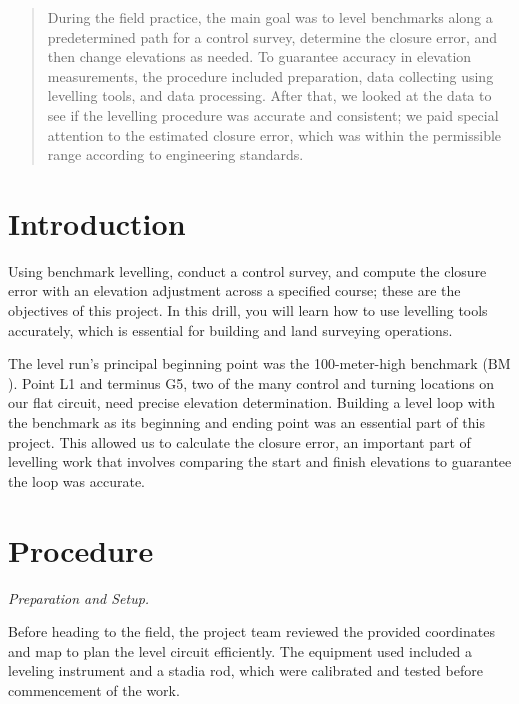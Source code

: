 \documentclass[12pt]{report}
\begin{document}
\newpage
\thispagestyle{fancy}
\pagestyle{fancy}
\begin{abstract}
During the field practice, the main goal was to level benchmarks along a predetermined path for a control survey, determine the closure error, and then change elevations as needed. To guarantee accuracy in elevation measurements, the procedure included preparation, data collecting using levelling tools, and data processing. After that, we looked at the data to see if the levelling procedure was accurate and consistent; we paid special attention to the estimated closure error, which was within the permissible range according to engineering standards.
\end{abstract}
\tableofcontents
\listoftables
\lstlistoflistings

\newpage


\section*{Introduction}

Using benchmark levelling, conduct a control survey, and compute the closure error with an elevation adjustment across a specified course; these are the objectives of this project. In this drill, you will learn how to use levelling tools accurately, which is essential for building and land surveying operations.

The level run's principal beginning point was the 100-meter-high benchmark (\(\text{BM}\)). Point L1 and terminus G5, two of the many control and turning locations on our flat circuit, need precise elevation determination. Building a level loop with the benchmark as its beginning and ending point was an essential part of this project. This allowed us to calculate the closure error, an important part of levelling work that involves comparing the start and finish elevations to guarantee the loop was accurate.

\section*{Procedure}

\textit{Preparation and Setup.}

Before heading to the field, the project team reviewed the provided coordinates and map to plan the level circuit efficiently. The equipment used included a leveling instrument and a stadia rod, which were calibrated and tested before commencement of the work.
\end{document}
